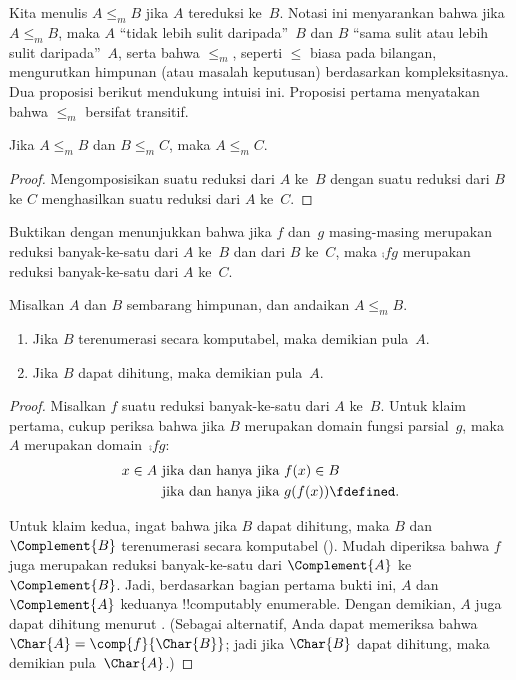 \documentclass[../../../include/open-logic-section]{subfiles}
\begin{document}

Kita menulis $A \leq_m B$ jika $A$ tereduksi ke~$B$. Notasi ini menyarankan
bahwa jika $A \leq_m B$, maka $A$ ``tidak lebih sulit daripada''~$B$ dan $B$
``sama sulit atau lebih sulit daripada''~$A$, serta bahwa $\le_m$, seperti
$\le$ biasa pada bilangan, mengurutkan himpunan (atau masalah keputusan)
berdasarkan kompleksitasnya. Dua proposisi berikut mendukung intuisi ini.
Proposisi pertama menyatakan bahwa $\le_m$ bersifat transitif.

\begin{prop}
Jika $A \leq_m B$ dan $B \leq_m C$, maka $A \leq_m C$.
\end{prop}

\begin{proof}
Mengomposisikan suatu reduksi dari $A$ ke~$B$ dengan suatu reduksi dari $B$ ke
$C$ menghasilkan suatu reduksi dari $A$ ke~$C$.
\end{proof}

\begin{prob}
Buktikan  dengan menunjukkan bahwa jika $f$ dan~$g$
masing-masing merupakan reduksi banyak-ke-satu dari $A$ ke~$B$ dan dari $B$
ke~$C$, maka $\comp{f}{g}$ merupakan reduksi banyak-ke-satu dari $A$ ke~$C$.
\end{prob}

\begin{prop}
Misalkan $A$ dan $B$ sembarang himpunan, dan andaikan $A \leq_m B$.
\begin{enumerate}
\item Jika $B$ terenumerasi secara komputabel, maka demikian pula~$A$.
\item Jika $B$ dapat dihitung, maka demikian pula~$A$.
\end{enumerate}
\end{prop}

\begin{proof}
Misalkan $f$ suatu reduksi banyak-ke-satu dari $A$ ke~$B$. Untuk klaim
pertama, cukup periksa bahwa jika $B$ merupakan domain fungsi parsial~$g$,
maka $A$ merupakan domain~$\comp{f}{g}$:
\begin{align*}
x \in A & \text{ jika dan hanya jika } f(x) \in B \\
& \text{ jika dan hanya jika }  g(f(x)) \fdefined.
\end{align*}

Untuk klaim kedua, ingat bahwa jika $B$ dapat dihitung, maka $B$
dan~$\Complement{B}$ terenumerasi secara komputabel
(). Mudah diperiksa bahwa $f$ juga merupakan reduksi
banyak-ke-satu dari $\Complement{A}$ ke $\Complement{B}$. Jadi, berdasarkan
bagian pertama bukti ini, $A$ dan~$\Complement{A}$ keduanya
!!{computably enumerable}. Dengan demikian, $A$ juga dapat dihitung menurut
. (Sebagai alternatif, Anda dapat memeriksa bahwa
$\Char{A} = \comp{f}{\Char{B}}$; jadi jika $\Char{B}$ dapat dihitung, maka
demikian pula~$\Char{A}$.)
\end{proof}
\end{document}
